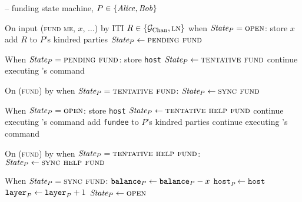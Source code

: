 \begin{center}
  \begin{systembox}{\fchan{} -- funding state machine, $P \in \{\mathit{Alice}, \mathit{Bob}\}$}
    \begin{algorithmic}[1]
      \State On input (\textsc{fund me}, $x$, $\dots$) by ITI $R \in \{\mathcal{G}_{\mathrm{Chan}},
      \textsc{ln}\}$ when $\itistate_P = \textsc{open}$:
      \label{code:functionality:fund:when-fund}
      \Indent
        \State store $x$
        \State add $R$ to $P$'s kindred parties
        \State $\itistate_P \gets \textsc{pending fund}$
      \EndIndent
      \Statex

      \State When $\itistate_P = \textsc{pending fund}$:
      \Indent
          \State store \texttt{host}
          \State $\itistate_P \gets \textsc{tentative fund}$
          \State continue executing \adversary's command
        \EndIf
      \EndIndent
      \Statex

      \State On (\textsc{fund}) by \adversary when $\itistate_P =
      \textsc{tentative fund}$:
      \Indent
        \State $\itistate_P \gets \textsc{sync fund}$
      \EndIndent
      \Statex

      \State When $\itistate_P = \textsc{open}$:
      \Indent
          \State store \texttt{host}
          \State $\itistate_P \gets \textsc{tentative help fund}$
          \State continue executing \adversary's command
        \EndIf
          \State add \texttt{fundee} to $P$'s kindred parties
          \State continue executing \adversary's command
        \EndIf
      \EndIndent
      \Statex

      \State On (\textsc{fund}) by \adversary when $\itistate_P =
      \textsc{tentative help fund}$:
      \Indent
        \State $\itistate_P \gets \textsc{sync help fund}$
      \EndIndent
      \Statex

      \State When $\itistate_P = \textsc{sync fund}$:
      \Indent
          \State $\texttt{balance}_{P} \gets \texttt{balance}_{P} - x$
          \label{code:functionality:fund:complete-fund}
          \State $\texttt{host}_P \gets \texttt{host}$
          \State {}
          \State $\texttt{layer}_{P} \gets \texttt{layer}_{P} + 1$
          \State $\itistate_P \gets \textsc{open}$
          \label{code:functionality:fund:fund-end}
        \EndIf
      \EndIndent
      \Statex


\end{algorithmic}
\end{systembox}
\end{center}
